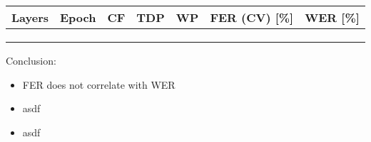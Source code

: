 \documentclass[11pt, a4paper, landscape]{article}
\begin{document}
\NewPage{}
\vfill
\begin{center}
\begin{tabular}{|l|l|l|l|l|l|l|} \toprule
	Layers & Epoch & CF & TDP & WP & FER (CV) {[}\%{]} & WER {[}\%{]} \\ \midrule
	&      &          &     &              &                   &              \\
	&      &          &     &              &                   &              \\
	&      &          &     &              &                   &              \\ \bottomrule
\end{tabular}
\end{center}
\vfill
Conclusion:
\begin{itemize}
	\item FER does not correlate with WER
	\item asdf
	\item asdf
\end{itemize}

\NewPage{}
\vfill
\vfill

\NewPage{}
\vfill
\vfill

\NewPage{}
\vfill
\vfill
\FinalPage
\end{document}
